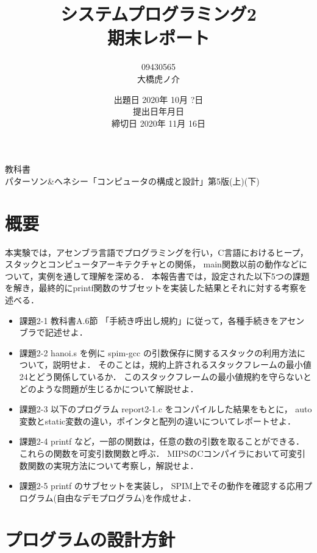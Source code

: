 \documentclass[11pt]{jarticle}
\begin{document}
\title{システムプログラミング2\\期末レポート}
\author{09430565\\大橋虎ノ介}
\date{出題日 2020年 10月 ?日\\
提出日\number\year 年\number\month 月\number\day 日\\
締切日 2020年 11月 16日}

\maketitle
\begin{center}
教科書\\
 パターソン\&ヘネシー「コンピュータの構成と設計」第5版(上)(下)
\end{center}
\newpage

\section{概要} \label{sec:abstract}

本実験では，アセンブラ言語でプログラミングを行い，C言語におけるヒープ，
スタックとコンピュータアーキテクチャとの関係， main関数以前の動作などについて，実例を通して理解を深める．
本報告書では，設定された以下5つの課題を解き，最終的にprintf関数のサブセットを実装した結果とそれに対する考察を述べる．

\begin{itemize}
  \item 課題2-1 教科書A.6節 「手続き呼出し規約」に従って，各種手続きをアセンブラで記述せよ．
  \item 課題2-2 hanoi.s を例に spim-gcc の引数保存に関するスタックの利用方法について，説明せよ． そのことは，規約上許されるスタックフレームの最小値24とどう関係しているか． このスタックフレームの最小値規約を守らないとどのような問題が生じるかについて解説せよ．
  \item 課題2-3 以下のプログラム report2-1.c をコンパイルした結果をもとに， auto変数とstatic変数の違い，ポインタと配列の違いについてレポートせよ．
  \item 課題2-4 printf など，一部の関数は，任意の数の引数を取ることができる． これらの関数を可変引数関数と呼ぶ． MIPSのCコンパイラにおいて可変引数関数の実現方法について考察し，解説せよ．
  \item 課題2-5 printf のサブセットを実装し， SPIM上でその動作を確認する応用プログラム(自由なデモプログラム)を作成せよ．
\end{itemize}

\section{プログラムの設計方針}
\end{document}
